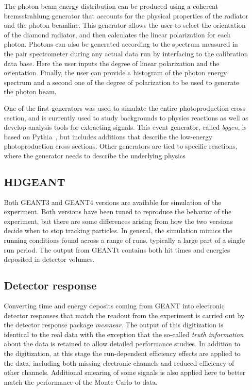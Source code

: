 The photon beam energy distribution can be produced using a coherent bremsstrahlung generator that accounts for the physical properties of the radiator and the photon beamline. This generator allows the user to select the orientation of the diamond radiator, and then calculates the linear polarization for each photon. Photons can also be generated according to the spectrum measured in the pair spectrometer during any actual data run by interfacing to the calibration data base. Here the user inputs the degree of linear polarization and the orientation. Finally, the user can provide a histogram of the photon energy spectrum and a second one of the degree of polarization to be used to generate the photon beam. 

One of the first generators was used to simulate the entire photoproduction cross section, and is currently used to study backgrounds to physics reactions as well as develop analysis tools for extracting signals. This event generator, called {\em bggen}, is based on Pythia~\cite{Sjostrand:2006za}, but includes additions that describe the low-energy photoproduction cross sections. Other generators are tied to specific reactions, where the generator needs to describe the underlying physics

\subsection{HDGEANT \label{sec:hdgeant}}
Both GEANT3 and GEANT4 versions are available for simulation of the experiment. Both versions have been tuned to reproduce the behavior of the experiment, but there are some differences arising from how the two versions decide when to stop tracking particles. In general, the simulation mimics the running conditions found across a range of runs, typically a large part of a single run period. The output from GEANTt contains both hit times and energies deposited in detector volumes. 

\subsection[Detector response]{Detector response}
Converting time and energy deposits coming from GEANT into electronic detector responses that match the readout from the experiment is carried out by the detector response package \textit{mcsmear}. The output of this digitization is identical to the real data with the exception that the so-called \emph{truth information} about the data is retained to allow detailed performance studies. In addition to the digitization, at this stage the run-dependent efficiency effects are applied to the data, including both missing electronic channels and reduced efficiency of other channels. Additional smearing of some signals is also applied here to better match the performance of the Monte Carlo to data. 

